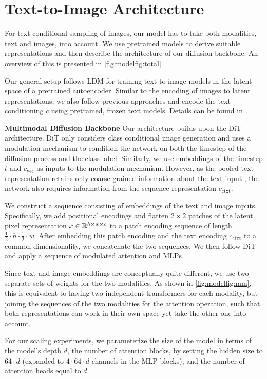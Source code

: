 \section{Text-to-Image Architecture}
\label{subsec:methodarch}
\modelarchitecture
%
\vspace{-0.5em}
For text-conditional sampling of images, our model has to take both modalities,
text and images, into account. We use pretrained models to derive suitable
representations and then describe the architecture of our diffusion backbone.
An overview of this is presented in \cref{fig:modelfig:total}.

Our general setup follows LDM \citep{Rombach_2022} for training text-to-image models in the latent space of a pretrained autoencoder.
Similar to the encoding of images to latent representations, we also follow
previous approaches \cite{saharia2022photorealistic, balaji2022ediffi} and encode the text conditioning $c$ using
pretrained, frozen text models. Details can be found in . 

%
%
%
%
%
%
%
%
%
%
%
%
%

%
%
%
%
%
%
%
%
%
%
%
%
%
%
%
%
%
%

\textbf{Multimodal Diffusion Backbone}
%
%
%
%
%
%
%
%
Our architecture builds upon the DiT \cite{Peebles_2023}
architecture. DiT only considers class conditional image generation and uses a
modulation mechanism to condition the network on both the timestep of the
diffusion process and the class label. Similarly, we use
embeddings of the timestep $t$ and $c_\text{vec}$ as inputs to the
modulation mechanism. However, as the pooled text representation retains only
coarse-grained information about the text input \cite{podell2023sdxl}, the network also
requires information from the sequence representation $c_\text{ctxt}$.

We construct a sequence consisting of embeddings of the text and image inputs.
Specifically, we add positional encodings and flatten $2\times 2$ patches of
the latent pixel representation $x \in \mathbb{R}^{h \times w \times c}$ to a patch
encoding sequence of length $\frac{1}{2} \cdot h \cdot \frac{1}{2} \cdot w$. 
After embedding this
patch encoding and the text encoding $c_\text{ctxt}$ to a common
dimensionality, we concatenate the two sequences. We then follow DiT and apply
a sequence of modulated attention and MLPs. %
%

Since text and image embeddings are conceptually quite different, we use two
separate sets of weights for the two modalities. As shown in \cref{fig:modelfig:mm}, this
is equivalent to having two independent transformers for each modality, but
joining the sequences of the two modalities for the attention operation, such
that both representations can work in their own space yet take the other one
into account.

For our scaling experiments, we parameterize the size of the model in terms of
the model's depth $d$, \ie the number of attention blocks, by setting the
hidden size to $64\cdot d$ (expanded to $4\cdot64\cdot d$ channels in the MLP
blocks), and the number of attention heads equal to $d$.
%


